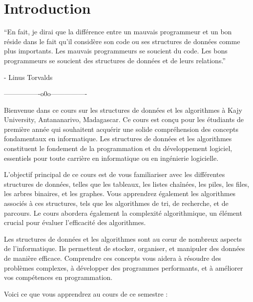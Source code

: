 \chapter*{Introduction}

\noindent ``En fait, je dirai que la différence entre un mauvais programmeur et un bon réside dans le fait qu'il considère son code ou ses structures de données comme plus importants. Les mauvais programmeurs se soucient du code. Les bons programmeurs se soucient des structures de données et de leurs relations.''

\hfill - Linus Torvalds

\begin{center}
	----------------o0o----------------
\end{center}

Bienvenue dans ce cours sur les structures de données et les algorithmes à Kajy University, Antananarivo, Madagascar. Ce cours est conçu pour les étudiants de première année qui souhaitent acquérir une solide compréhension des concepts fondamentaux en informatique. Les structures de données et les algorithmes constituent le fondement de la programmation et du développement logiciel, essentiels pour toute carrière en informatique ou en ingénierie logicielle.

L'objectif principal de ce cours est de vous familiariser avec les différentes structures de données, telles que les tableaux, les listes chaînées, les piles, les files, les arbres binaires, et les graphes. Vous apprendrez également les algorithmes associés à ces structures, tels que les algorithmes de tri, de recherche, et de parcours. Le cours abordera également la complexité algorithmique, un élément crucial pour évaluer l'efficacité des algorithmes.

Les structures de données et les algorithmes sont au cœur de nombreux aspects de l'informatique. Ils permettent de stocker, organiser, et manipuler des données de manière efficace. Comprendre ces concepts vous aidera à résoudre des problèmes complexes, à développer des programmes performants, et à améliorer vos compétences en programmation.

Voici ce que vous apprendrez au cours de ce semestre :


